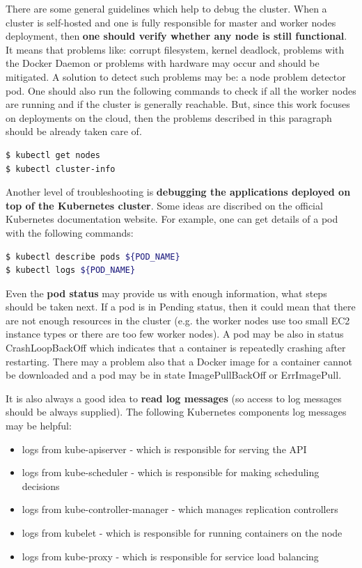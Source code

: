 There are some general guidelines which help to debug the cluster. When a cluster is self-hosted and one is fully responsible for master and worker nodes deployment, then \textbf{one should verify whether any node is still functional}. It means that problems like: corrupt filesystem, kernel deadlock, problems with the Docker Daemon or problems with hardware may occur and should be mitigated. A solution to detect such problems may be: a node problem detector pod\cite{book-mastering-k8s}. One should also run the following commands to check if all the worker nodes are running and if the cluster is generally reachable. But, since this work focuses on deployments on the cloud, then the problems described in this paragraph should be already taken care of.
\begin{lstlisting}[basicstyle=\tiny,caption={Getting information about a cluster},captionpos=b,language=Bash,xleftmargin=1cm]
$ kubectl get nodes
$ kubectl cluster-info
\end{lstlisting}

Another level of troubleshooting is \textbf{debugging the applications deployed on top of the Kubernetes cluster}. Some ideas are discribed on the official Kubernetes documentation website\cite{k8s-deb}. For example, one can get details of a pod with the following commands:
\begin{lstlisting}[basicstyle=\tiny,caption={Getting information about pods},captionpos=b,language=Bash,xleftmargin=1cm]
$ kubectl describe pods ${POD_NAME}
$ kubectl logs ${POD_NAME}
\end{lstlisting}

Even the \textbf{pod status} may provide us with enough information, what steps should be taken next. If a pod is in Pending status, then it could mean that there are not enough resources in the cluster (e.g. the worker nodes use too small EC2 instance types or there are too few worker nodes). A pod may be also in status CrashLoopBackOff which indicates that a container is repeatedly crashing after restarting. There may a problem also that a Docker image for a container cannot be downloaded and a pod may be in state ImagePullBackOff or ErrImagePull\cite{k8s-google-tr}.

It is also always a good idea to \textbf{read log messages} (so access to log messages should be always supplied). The following Kubernetes components log messages may be helpful\cite{k8s-deb-cluster}:
\begin{itemize}
\item logs from kube-apiserver - which is responsible for serving the API
\item logs from kube-scheduler - which is responsible for making scheduling decisions
\item logs from kube-controller-manager - which manages replication controllers
\item logs from kubelet - which is responsible for running containers on the node
\item logs from kube-proxy - which is responsible for service load balancing
\end{itemize}

